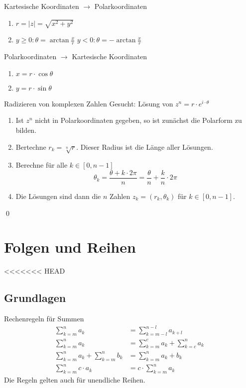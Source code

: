 \documentclass[german]{../spicker}
\renewcommand{\abs}[1]{\left| #1 \right|}
\begin{document}
\begin{algo}{Kartesische Koordinaten $\to$ Polarkoordinaten}
    \begin{enumerate}
        \item $r = \abs{z} = \sqrt{x^2 + y^2}$
        \item
              \subitem $y \geq 0 : \theta = \arctan \frac{x}{r}$
              \subitem $y < 0 : \theta = -\arctan \frac{x}{r}$
    \end{enumerate}
\end{algo}

\begin{algo}{Polarkoordinaten $\to$ Kartesische Koordinaten}
    \begin{enumerate}
        \item $x = r \cdot \cos \theta$
        \item $y = r \cdot \sin \theta$
    \end{enumerate}
\end{algo}

\begin{algo}{Radizieren von komplexen Zahlen}
    Gesucht: Lösung von $z^n = r \cdot e^{i\cdot \theta}$
    \begin{enumerate}
        \item Ist $z^n$ nicht in Polarkoordinaten gegeben, so ist zunächst die Polarform zu bilden.
        \item Bertechne $r_k = \sqrt[n]{r}$. Dieser Radius ist die Länge aller Lösungen.
        \item Berechne für alle $k \in [0, n-1]$
              $$
                  \theta_k = \frac{\theta + k\cdot 2\pi}{n} = \frac{\theta}{n} + \frac{k}{n} \cdot 2\pi
              $$
        \item Die Lösungen sind dann die $n$ Zahlen $z_k = (r_k, \theta_k)$ für $k \in [0, n-1]$.
    \end{enumerate}
    \qed
\end{algo}

\section{Folgen und Reihen}

<<<<<<< HEAD
\subsection{Grundlagen}
\begin{bonus}{Rechenregeln für Summen}
    $$
        \begin{aligned}
            \sum_{k=m}^n a_k                    & = \sum_{k=m-l}^{n-l} a_{k+l}          \\
            \sum_{k=m}^n a_k                    & = \sum_{k=m}^c a_k + \sum_{k=c}^n a_k \\
            \sum_{k=m}^n a_k + \sum_{k=m}^n b_k & = \sum_{k=m}^n a_k + b_k              \\
            \sum_{k=m}^n c\cdot a_k             & = c\cdot\sum_{k=m}^n a_k
        \end{aligned}
    $$
    Die Regeln gelten auch für unendliche Reihen.
\end{bonus}
\end{document}
